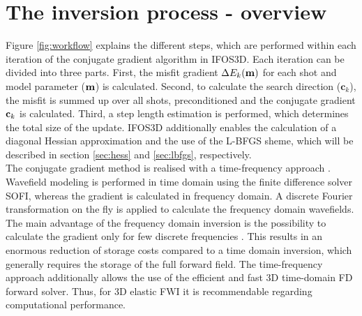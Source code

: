 \section{The inversion process - overview}
Figure \ref{fig:workflow} explains the different steps, which are performed within each iteration of the conjugate gradient algorithm in IFOS3D. Each iteration can be divided into three parts. First, the misfit gradient $\Delta E_k(\textbf m)$ for each shot and model parameter ($\textbf m$) is calculated. Second, to calculate the search direction ($\textbf{c}_k$), the misfit is summed up over all shots, preconditioned and the conjugate gradient $\textbf c_k$ is calculated. Third, a step length estimation is performed, which determines the total size of the update. IFOS3D additionally enables the calculation of a diagonal Hessian approximation and the use of the L-BFGS sheme, which will be described in section \ref{sec:hess} and \ref{sec:lbfgs}, respectively.\\
The conjugate gradient method is realised with a time-frequency approach \citep{Sir08}. Wavefield modeling is performed in time domain using the finite difference solver SOFI, whereas the gradient is calculated in frequency domain. A discrete Fourier transformation on the fly is applied to calculate the frequency domain wavefields. The main advantage of the frequency domain inversion is the possibility to calculate the gradient only for few discrete frequencies \citep[e.g.][]{Pra99,Sir04,Bro09}. This results in an enormous reduction of storage costs compared to a time domain inversion, which generally requires the storage of the full forward field. The time-frequency approach additionally allows the use of the efficient and fast 3D time-domain FD forward solver. Thus, for 3D elastic FWI it is recommendable regarding computational performance. 

